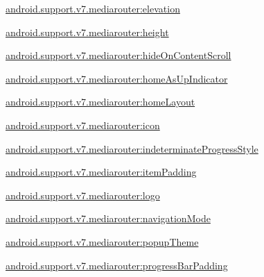{\ttfamily \hyperlink{classandroid_1_1support_1_1v7_1_1mediarouter_1_1R_1_1styleable_a1396d5d60613c38317526a6e7e72a56e}{android.\+support.\+v7.\+mediarouter\+:elevation}}

{\ttfamily \hyperlink{classandroid_1_1support_1_1v7_1_1mediarouter_1_1R_1_1styleable_a0262117be883a00962241b45aaafbce2}{android.\+support.\+v7.\+mediarouter\+:height}}

{\ttfamily \hyperlink{classandroid_1_1support_1_1v7_1_1mediarouter_1_1R_1_1styleable_acda53a948ac9d1be56e1645847c13e3f}{android.\+support.\+v7.\+mediarouter\+:hide\+On\+Content\+Scroll}}

{\ttfamily \hyperlink{classandroid_1_1support_1_1v7_1_1mediarouter_1_1R_1_1styleable_ade721da752b0720b0d2e366f8abc084b}{android.\+support.\+v7.\+mediarouter\+:home\+As\+Up\+Indicator}}

{\ttfamily \hyperlink{classandroid_1_1support_1_1v7_1_1mediarouter_1_1R_1_1styleable_a20714fb94d0bf9ede79ff6e4154903da}{android.\+support.\+v7.\+mediarouter\+:home\+Layout}}

{\ttfamily \hyperlink{classandroid_1_1support_1_1v7_1_1mediarouter_1_1R_1_1styleable_ac13b4a2a325df9a1fc313d6ed89c2f35}{android.\+support.\+v7.\+mediarouter\+:icon}}

{\ttfamily \hyperlink{classandroid_1_1support_1_1v7_1_1mediarouter_1_1R_1_1styleable_af9e24d848119a9a402fa2fd5a9966125}{android.\+support.\+v7.\+mediarouter\+:indeterminate\+Progress\+Style}}

{\ttfamily \hyperlink{classandroid_1_1support_1_1v7_1_1mediarouter_1_1R_1_1styleable_a12d3d9b42458f497ce5fb06b1d183a09}{android.\+support.\+v7.\+mediarouter\+:item\+Padding}}

{\ttfamily \hyperlink{classandroid_1_1support_1_1v7_1_1mediarouter_1_1R_1_1styleable_a8014c62055ea861d1382563e95509433}{android.\+support.\+v7.\+mediarouter\+:logo}}

{\ttfamily \hyperlink{classandroid_1_1support_1_1v7_1_1mediarouter_1_1R_1_1styleable_a5499976bc56773a56860247e2573a497}{android.\+support.\+v7.\+mediarouter\+:navigation\+Mode}}

{\ttfamily \hyperlink{classandroid_1_1support_1_1v7_1_1mediarouter_1_1R_1_1styleable_aa0992ab7275b62ffde97216eab719afa}{android.\+support.\+v7.\+mediarouter\+:popup\+Theme}}

{\ttfamily \hyperlink{classandroid_1_1support_1_1v7_1_1mediarouter_1_1R_1_1styleable_ae3c6eae45f61967228281bbb4ea316bf}{android.\+support.\+v7.\+mediarouter\+:progress\+Bar\+Padding}}

